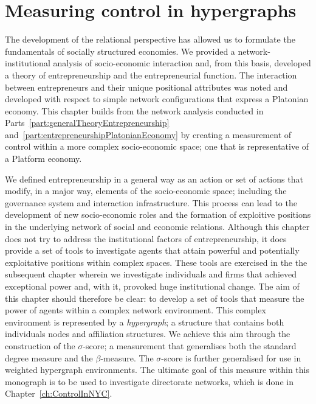 \chapter{Measuring control in hypergraphs}
\label{ch:MeasuringHypergraphControl}

The development of the relational perspective has allowed us to formulate the fundamentals of socially structured economies. We provided a network-institutional analysis of socio-economic interaction and, from this basis, developed a theory of entrepreneurship and the entrepreneurial function. The interaction between entrepreneurs and their unique positional attributes was noted and developed with respect to simple network configurations that express a Platonian economy. This chapter builds from the network analysis conducted in Parts~\ref{part:generalTheoryEntrepreneurship} and~\ref{part:entrepreneurshipPlatonianEconomy} by creating a measurement of control within a more complex socio-economic space; one that is representative of a Platform economy.

We defined entrepreneurship in a general way as an action or set of actions that modify, in a major way, elements of the socio-economic space; including the governance system and interaction infrastructure. This process can lead to the development of new socio-economic roles and the formation of exploitive positions in the underlying network of social and economic relations. Although this chapter does not try to address the institutional factors of entrepreneurship, it does provide a set of tools to investigate agents that attain powerful and potentially exploitative positions within complex spaces. These tools are exercised in the the subsequent chapter wherein we investigate individuals and firms that achieved exceptional power and, with it, provoked huge institutional change. The aim of this chapter should therefore be clear: to develop a set of tools that measure the power of agents within a complex network environment. This complex environment is represented by a \emph{hypergraph}; a structure that contains both individuals nodes and affiliation structures. We achieve this aim through the construction of the $\sigma$-score; a measurement that generalises both the standard degree measure and the $\beta$-measure. The $\sigma$-score is further generalised for use in weighted hypergraph environments. The ultimate goal of this measure within this monograph is to be used to investigate directorate networks, which is done in Chapter~\ref{ch:ControlInNYC}.

